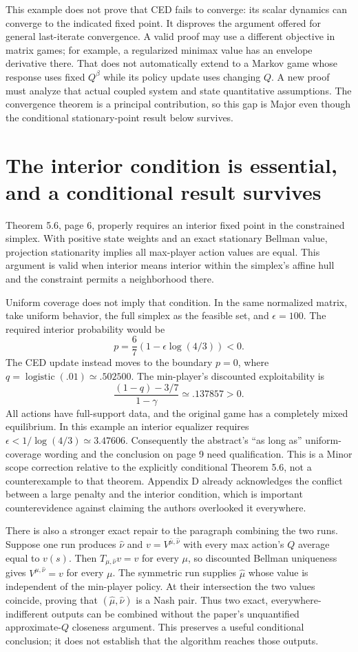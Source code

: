 \documentclass[10pt]{article}
\begin{document}
This example does not prove that CED fails to converge: its scalar dynamics can converge to the indicated fixed point. It disproves the argument offered for general last-iterate convergence. A valid proof may use a different objective in matrix games; for example, a regularized minimax value has an envelope derivative there. That does not automatically extend to a Markov game whose response uses fixed \(Q^\beta\) while its policy update uses changing \(Q\). A new proof must analyze that actual coupled system and state quantitative assumptions. The convergence theorem is a principal contribution, so this gap is Major even though the conditional stationary-point result below survives.\par
\section*{The interior condition is essential, and a conditional result survives}
Theorem 5.6, page 6, properly requires an interior fixed point in the constrained simplex. With positive state weights and an exact stationary Bellman value, projection stationarity implies all max-player action values are equal. This argument is valid when interior means interior within the simplex’s affine hull and the constraint permits a neighborhood there.\par
Uniform coverage does not imply that condition. In the same normalized matrix, take uniform behavior, the full simplex as the feasible set, and \(\epsilon=100\). The required interior probability would be \[p=\frac67\left(1-\epsilon\log(4/3)\right)<0.\] The CED update instead moves to the boundary \(p=0\), where \(q=\operatorname{logistic}(.01)\simeq.502500\). The min-player’s discounted exploitability is \[\frac{(1-q)-3/7}{1-\gamma}\simeq .137857>0.\] All actions have full-support data, and the original game has a completely mixed equilibrium. In this example an interior equalizer requires \(\epsilon<1/\log(4/3)\simeq3.47606\). Consequently the abstract’s “as long as” uniform-coverage wording and the conclusion on page 9 need qualification. This is a Minor scope correction relative to the explicitly conditional Theorem 5.6, not a counterexample to that theorem. Appendix D already acknowledges the conflict between a large penalty and the interior condition, which is important counterevidence against claiming the authors overlooked it everywhere.\par
There is also a stronger exact repair to the paragraph combining the two runs. Suppose one run produces \(\hat\nu\) and \(v=V^{\bar\mu,\hat\nu}\) with every max action’s \(Q\) average equal to \(v(s)\). Then \(T_{\mu,\hat\nu}v=v\) for every \(\mu\), so discounted Bellman uniqueness gives \(V^{\mu,\hat\nu}=v\) for every \(\mu\). The symmetric run supplies \(\hat\mu\) whose value is independent of the min-player policy. At their intersection the two values coincide, proving that \((\hat\mu,\hat\nu)\) is a Nash pair. Thus two exact, everywhere-indifferent outputs can be combined without the paper’s unquantified approximate-\(Q\) closeness argument. This preserves a useful conditional conclusion; it does not establish that the algorithm reaches those outputs.\par
\end{document}
